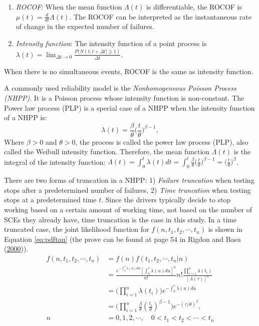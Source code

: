 \documentclass[12pt]{book}
\numberwithin{equation}{chapter}
\providecommand{\tightlist}{%
  \setlength{\itemsep}{0pt}\setlength{\parskip}{0pt}}
\begin{document}
\begin{enumerate}
\def\labelenumi{\arabic{enumi}.}
\tightlist
\item
  \emph{ROCOF}: When the mean function \(\Lambda(t)\) is differentiable, the ROCOF is \(\mu(t) = \frac{d}{dt}\Lambda(t)\). The ROCOF can be interpreted as the instantaneous rate of change in the expected number of failures.
\item
  \emph{Intensity function}: The intensity function of a point process is
  \(\lambda(t) = \lim_{\Delta t \rightarrow 0}\frac{P(N(t, t+\Delta t] \geq 1)}{\Delta t}\).
\end{enumerate}

When there is no simultaneous events, ROCOF is the same as intensity function.

A commonly used reliability model is the \emph{Nonhomogeneous Poisson Process (NHPP)}. It is a Poisson process whose intensity function is non-constant. The Power law process (PLP) is a special case of a NHPP when the intensity function of a NHPP is:
\begin{equation}
\lambda(t) = \frac{\beta}{\theta}\bigg(\frac{t}{\theta}\bigg)^{\beta-1},
\label{eq:plp}
\end{equation}
Where \(\beta > 0\) and \(\theta > 0\), the process is called the power law process (PLP), also called the Weibull intensity function. Therefore, the mean function \(\Lambda(t)\) is the integral of the intensity function: \(\Lambda(t) = \int_0^t \lambda(t)dt = \int_0^t \frac{\beta}{\theta}\bigg(\frac{t}{\theta}\bigg)^{\beta-1} = \bigg(\frac{t}{\theta}\bigg)^{\beta}\).

There are two forms of truncation in a NHPP: 1) \emph{Failure truncation} when testing stops after a predetermined number of failures, 2) \emph{Time truncation} when testing stops at a predetermined time \(t\). Since the drivers typically decide to stop working based on a certain amount of working time, not based on the number of SCEs they already have, time truncation is the case in this study. In a time truncated case, the joint likelihood function for \(f(n, t_1, t_2, \cdots, t_n)\) is shown in Equation \eqref{eq:pdftau} (the prove can be found at page 54 in Rigdon and Basu (\protect\hyperlink{ref-rigdon2000statistical}{2000})).
\begin{equation}
\begin{aligned}
f(n, t_1, t_2, \cdots, t_n) & = f(n)f(t_1, t_2, \cdots, t_n|n)\\
& = \frac{e^{-\int_0^\tau \lambda(u)du}[\int_0^\tau \lambda(u)du]^n}{n!}n!\frac{\prod_{i=1}^n\lambda(t_i)}{[\Lambda(\tau)]^n}\\
& = \Big(\prod_{i=1}^n\lambda(t_i) \Big)e^{-\int_0^\tau \lambda(u)du}\\
& = \Big(\prod_{i=1}^n\frac{\beta}{\theta}(\frac{t_i}{\theta})^{\beta - 1} \Big)e^{-(\tau/\theta)^\beta},\\ 
n & = 0, 1, 2, \cdots, \quad  0 < t_1 < t_2 < \cdots < t_n
\label{eq:pdftau}
\end{aligned}
\end{equation}
\end{document}
